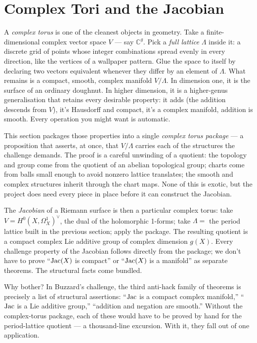 \section{Complex Tori and the Jacobian}
\label{sec:complex-tori-jacobians}

\begin{layman}
A \emph{complex torus} is one of the cleanest objects in geometry.
Take a finite-dimensional complex vector space \(V\) --- say
\(\mathbb{C}^g\). Pick a \emph{full lattice} \(\Lambda\) inside it:
a discrete grid of points whose integer combinations spread evenly
in every direction, like the vertices of a wallpaper pattern. Glue
the space to itself by declaring two vectors equivalent whenever
they differ by an element of \(\Lambda\). What remains is a
compact, smooth, complex manifold \(V/\Lambda\). In dimension one,
it is the surface of an ordinary doughnut. In higher dimension, it
is a higher-genus generalisation that retains every desirable
property: it adds (the addition descends from \(V\)), it's
Hausdorff and compact, it's a complex manifold, addition is smooth.
Every operation you might want is automatic.

This section packages those properties into a single
\emph{complex torus package} --- a proposition that asserts, at
once, that \(V/\Lambda\) carries each of the structures the
challenge demands. The proof is a careful unwinding of a quotient:
the topology and group come from the quotient of an abelian
topological group; charts come from balls small enough to avoid
nonzero lattice translates; the smooth and complex structures
inherit through the chart maps. None of this is exotic, but the
project does need every piece in place before it can construct
the Jacobian.

The \emph{Jacobian} of a Riemann surface is then a particular
complex torus: take \(V = H^0(X,\Omega^1_X)^{\vee}\), the dual of
the holomorphic 1-forms; take \(\Lambda = \) the period lattice
built in the previous section; apply the package. The resulting
quotient is a compact complex Lie additive group of complex
dimension \(g(X)\). Every challenge property of the Jacobian
follows directly from the package; we don't have to prove
``\(\operatorname{Jac}(X)\) is compact'' or ``\(\operatorname{Jac}(X)\) is a manifold'' as
separate theorems. The structural facts come bundled.

Why bother? In Buzzard's challenge, the third anti-hack family of
theorems is precisely a list of structural assertions: ``\(\operatorname{Jac}\)
is a compact complex manifold,'' ``\(\operatorname{Jac}\) is a Lie additive
group,'' ``addition and negation are smooth.'' Without the
complex-torus package, each of these would have to be proved by
hand for the period-lattice quotient --- a thousand-line excursion.
With it, they fall out of one application.
\end{layman}

